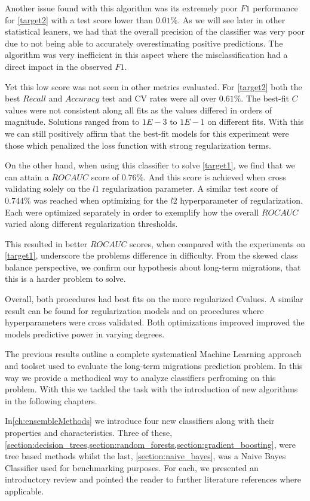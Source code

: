 Another issue found with this algorithm was its extremely poor $F1$ performance for \cref{target2} with a test score lower than $0.01\%$.
As we will see later in other statistical leaners, we had that
the overall precision of the classifier was very poor due to not being able to accurately overestimating positive predictions.
The algorithm was very inefficient in this aspect where the misclassification had a direct impact in the observed $F1$.


Yet this low score was not seen in other metrics evaluated.
For \cref{target2} both the best $Recall$ and $Accuracy$ test and CV rates were all over $0.61\%$.
The best-fit $C$ values were not consistent along all fits as the values differed in orders of magnitude.
Solutions ranged from to $1E-3$ to $1E-1$ on different fits.
With this we can still positively affirm that the best-fit models for this experiment were those which penalized the loss function with strong regularization terms.


On the other hand, when using this classifier to solve \cref{target1}, we find that we can attain a $ROC AUC$ score of $0.76\%$.
And this score is achieved when cross validating solely on the $l1$ regularization parameter.
A similar test score of $0.744\%$ was reached when optimizing for the $l2$ hyperparameter of regularization.
Each were optimized separately in order to exemplify how the overall $ROC AUC$ varied along different regularization thresholds.

This resulted in better $ROC AUC$ scores, when compared with the experiments on \cref{target1}, underscore the problems difference in difficulty.
From the skewed class balance perspective, we confirm our hypothesis about long-term migrations, that this is a harder problem to solve.

Overall, both procedures had best fits on the more regularized $C$values.
A similar result can be found for regularization models and on procedures where hyperparameters were cross validated.
Both optimizations improved improved the models predictive power in varying degrees.


The previous results outline a complete systematical Machine Learning approach and toolset used to evaluate the long-term migrations prediction problem.
In this way we provide a methodical way to analyze classifiers perfroming on this problem.
With this we tackled the task with the introduction of new algorithms in the following chapters.



In\cref{ch:ensembleMethods} we introduce four new classifiers along with their properties and characteristics. Three of these, \cref{section:decision_trees,section:random_forests,section:gradient_boosting}, were tree based methods whilst the last, \cref{section:naive_bayes}, was a Naive Bayes Classifier used for benchmarking purposes.
For each, we presented an introductory review and pointed the reader to further literature references where applicable.

